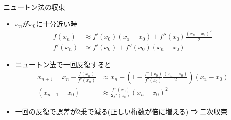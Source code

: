 \begin{frame}[t,fragile]{ニュートン法の収束}
  \begin{itemize}
    \setlength{\itemsep}{1em}
  \item $x_n$が$x_0$に十分近い時
    \begin{align*}
      f(x_n) &\approx f'(x_0) (x_n-x_0) + f''(x_0) \frac{(x_n - x_0)^2}{2} \\
      f'(x_n) &\approx f'(x_0) + f''(x_0) (x_n - x_0)
    \end{align*}
  \item ニュートン法で一回反復すると
    \begin{align*}
      x_{n+1} =  x_n - \frac{f(x_n)}{f'(x_n)} &\approx x_n - (1-\frac{f''(x_0)}{f'(x_0)}\frac{(x_n-x_0)}{2})(x_n-x_0) \\
      (x_{n+1}-x_0) &\approx \frac{f''(x_0)}{2f'(x_0)} (x_n - x_0)^2
    \end{align*}
    \item 一回の反復で誤差が2乗で減る(正しい桁数が倍に増える) ⇒ 二次収束
  \end{itemize}
\end{frame}

